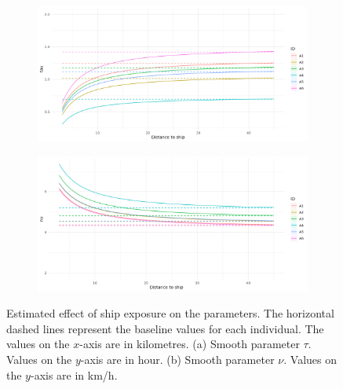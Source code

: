 \documentclass[11pt]{article}
\newcommand {\1}{\mathbb{1}}
\theoremstyle{definition}
\theoremstyle{remark}
\theoremstyle{remark}
\begin{document}
 \begin{figure}[H]
 	\begin{subfigure}{0.98\textwidth}\centering
 		\includegraphics[width=0.7\linewidth]{"images/application/response/me_response3_tau_ExpShip.png"}
 		\caption{}
 	\end{subfigure}
 	
 	\begin{subfigure}{0.98\textwidth}
 		\centering
 		\includegraphics[width=0.7\linewidth]{"images/application/response/me_response3_nu_ExpShip.png"}
 		\caption{}
 	\end{subfigure}
 	\caption{Estimated effect of ship exposure on the parameters. The horizontal dashed lines represent the baseline values for each individual. The values on the $x$-axis are in kilometres. (a)  Smooth parameter $\tau$. Values on the $y$-axis are in hour. (b) Smooth parameter $\nu$. Values on the $y$-axis are in km/h.}
 	\label{fig: me response}
 \end{figure}
\end{document}
